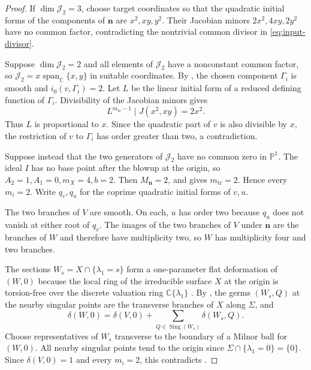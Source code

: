 \documentclass[11pt,letterpaper]{article}
\numberwithin{equation}{section}
\theoremstyle{remark}
\theoremstyle{plain}
\newcommand{\C}{\mathbb{C}}
\begin{document}
\begin{proof}
If $\dim\mathcal J_2=3$, choose target coordinates so that the quadratic
initial forms of the components of $\boldsymbol n$ are $x^2,xy,y^2$.
Their Jacobian minors $2x^2,4xy,2y^2$ have no common factor, contradicting the
nontrivial common divisor in \eqref{eq:input-divisor}.

Suppose $\dim\mathcal J_2=2$ and all elements of $\mathcal J_2$ have a nonconstant common factor,
so $\mathcal J_2=x\operatorname{span}_{\C}\{x,y\}$ in suitable coordinates.
By , the chosen component $\Gamma_i$
is smooth and $i_0(v,\Gamma_i)=2$.  Let $L$ be the linear initial
form of a reduced defining function of $\Gamma_i$.  Divisibility of the
Jacobian minors gives
\[
 L^{m_{\mathrm{tr}}-1}\mid J(x^2,xy)=2x^2.
\]
Thus $L$ is proportional to $x$.  Since the quadratic part of $v$
is also divisible by $x$, the restriction of $v$ to $\Gamma_i$ has order
greater than two, a contradiction.

Suppose instead that the two generators of $\mathcal J_2$ have no common zero in $\mathbb P^1$.
The ideal $I$ has no base point after the blowup at the origin, so
$A_2=1,A_1=0,m_X=4,b=2$.  Then $M_{\boldsymbol n}=2$, and
 gives $m_{\mathrm{tr}}=2$.
Hence every $m_i=2$.  Write $q_v,q_u$ for the coprime quadratic
initial forms of $v,u$.

The two branches of $V$ are smooth.  On each, $u$ has order two
because $q_u$ does not vanish at either root of $q_v$.  The images of the two branches of $V$ under $\boldsymbol n$
are the branches of $W$ and therefore have multiplicity two, so $W$
has multiplicity four and two branches.

The sections $W_s=X\cap\{\lambda_1=s\}$ form a one-parameter flat
deformation of $(W,0)$ because the local ring of the irreducible surface
$X$ at the origin is torsion-free over the discrete valuation ring
$\C\{\lambda_1\}$ \cite[Theorem~B.8.11]{GreuelLossenShustin}.
By \cite[Proposition~2.10 and Section~2.2]{PortillaReduction},
the germs $(W_s,Q)$ at the nearby singular points are the transverse
branches of $X$ along $\Sigma$, and
\[
 \delta(W,0)=\delta(V,0)+
 \sum_{Q\in\operatorname{Sing}(W_s)}\delta(W_s,Q).
\]
Choose representatives of $W_s$ transverse to the boundary of a Milnor ball for $(W,0)$.
All nearby singular points tend to the origin since
$\Sigma\cap\{\lambda_1=0\}=\{0\}$.  Since $\delta(V,0)=1$ and
every $m_i=2$, this contradicts .


\end{proof}
\end{document}

